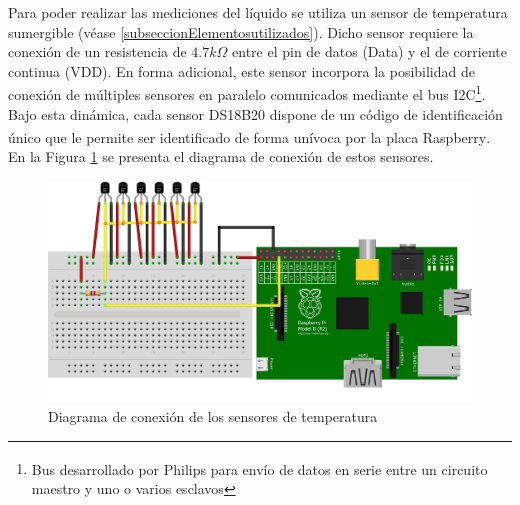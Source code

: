         \par Para poder realizar las mediciones del líquido se utiliza un sensor de temperatura sumergible (véase \ref{subseccionElementosutilizados}). Dicho sensor requiere la conexión de un resistencia de $4.7k\Omega$ entre el pin de datos (Data) y el de corriente continua (VDD). En forma adicional, este sensor incorpora la posibilidad de conexión de múltiples sensores en paralelo comunicados mediante el bus I2C\footnote{Bus desarrollado por Philips\textsuperscript{\textregistered} para envío de datos en serie entre un circuito maestro y uno o varios esclavos}. Bajo esta dinámica, cada sensor DS18B20 dispone de un código de identificación único que le permite ser identificado de forma unívoca por la placa Raspberry\textsuperscript{\textregistered}. En la Figura \ref{fig:ConexionTemperatura} se presenta el diagrama de conexión de estos sensores.
        \begin{figure}
            \centering
            \includegraphics[scale = 0.8]{DiagramaSensordeTemp_bb.jpg}
            \caption{Diagrama de conexión de los sensores de temperatura}
            \label{fig:ConexionTemperatura}
        \end{figure}
        

